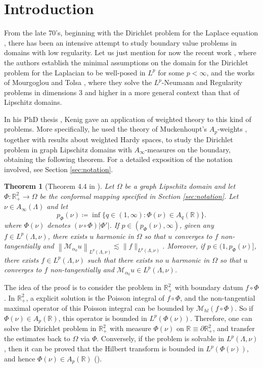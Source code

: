 \documentclass[12pt]{amsart}
\newcommand{\R}{\mathbb{R}}
\theoremstyle{plain}
\newtheorem{theorem}{Theorem}[section]
\theoremstyle{definition}
\numberwithin{equation}{section}
\begin{document}
\section{Introduction} \label{sec:section1_intro}


From the late 70's, beginning with the Dirichlet problem for the Laplace equation \cite{DahlbergHarmonicMeasure}, there has been an intensive attempt to study boundary value problems in domains with low regularity.  Let us just mention for now the recent  work \cite{AHMMT2020}, where the authors establish the minimal assumptions on the domain for the Dirichlet problem for the Laplacian to be well-posed in $L^p$ for some $p<\infty$, and the works of Mourgoglou and Tolsa \cite{MTregularity, MTneumann}, where they solve the $L^p$-Neumann and Regularity problems in dimensions $3$ and higher in a more general context than that of Lipschitz domains. 

In his PhD thesis \cite{kenigWeighted}, Kenig gave an application of weighted theory to this kind of problems. More specifically, he used the theory of Muckenhoupt's $A_p$-weights \cite{M1972}, together with results about weighted Hardy spaces, to study the Dirichlet problem in graph Lipschitz domains with $A_{\infty}$-measures on the boundary, obtaining the following theorem. For a detailed exposition of the notation involved, see Section \ref{sec:notation}.

\begin{theorem}[Theorem 4.4 in \cite{kenigWeighted}]\label{thm:thm4.4_Kenig}
    Let $\Omega$ be a graph Lipschitz domain and let $\Phi\colon \R_{+}^{2}\to \Omega$ be the conformal mapping specified in Section \ref{sec:notation}. Let $\nu\in A_{\infty}(\Lambda)$ and let 
 \begin{equation}\label{pfi}
    p_{\Phi}(\nu)
    \coloneqq 
    \inf\{q\in (1,\infty): \Phi(\nu)\in A_{q}(\R)\}.
\end{equation}
    where $\Phi(\nu)$ denotes $(\nu\circ \Phi)|\Phi'|$.     
    If $p\in (p_{\Phi}(\nu),\infty)$, given any $f \in L^p(\Lambda,  \nu)$, there exists $u$ harmonic in $\Omega$ so that $u$ converges to $f$ non-tangentially and  $\left\|\mathcal{M}_{\alpha_0} u\right\|_{L^p(\Lambda,  \nu)} \lesssim \|f\|_{L^p(\Lambda, \nu)}$. Moreover, if $p\in (1,p_{\Phi}(\nu)]$, there exists $f \in  L^p(\Lambda,  \nu)$ such that there exists no $u$ harmonic in $\Omega$ so that $u$ converges to $f$ non-tangentially and $\mathcal{M}_{\alpha_0} u \in L^p(\Lambda,  \nu)$.
\end{theorem}
The idea of the proof is to consider the problem in $\R_{+}^{2}$ with boundary datum $f\circ\Phi$. In $\R_{+}^{2}$, a explicit solution is the Poisson integral of $f\circ\Phi$, and the non-tangential maximal operator of this Poisson integral can be bounded by $\mathcal{M}_{hl}(f\circ\Phi)$. So if $\Phi(\nu)\in A_p(\R)$,  this operator is bounded in $L^p(\Phi(\nu))$. Therefore, one can solve the Dirichlet problem in $\R_{+}^{2}$ with measure $\Phi(\nu)$ on $\R\equiv\partial\R_{+}^{2}$, and transfer the estimates back to $\Omega$ via $\Phi$. Conversely, if the problem is solvable in $L^p(\Lambda,\nu)$, then it can be proved that the Hilbert transform is bounded in $L^p(\Phi(\nu))$, and hence $\Phi(\nu)\in A_p(\R)$ (\cite{HMW}).
\end{document}
